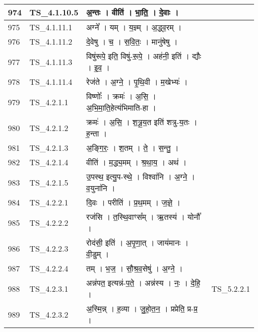 \documentclass[17pt]{extarticle}
\begin{document}
\begin{longtable}{||p{0.4in}||p{0.9in}||p{4.0in}||p{0.9in}||}
        \hline
            974 & TS\_4.1.10.5 & अ॒न्तः   ।   वीति॑   ।   भा॒ति॒   ।   दे॒वाः   ।    &      \\
        \hline
            975 & TS\_4.1.11.1 & अग्ने᳚   ।   यम्   ।   य॒ज्ञ्म्   ।   अ॒द्ध्व॒रम्   ।    &      \\
        \hline
            976 & TS\_4.1.11.2 & दे॒वेषु   ।   च॒   ।   स॒वि॒तः॒   ।   मानु॑षेषु   ।    &      \\
        \hline
            977 & TS\_4.1.11.3 & विषु॑रूपे॒ इति॒ विषु॑{-}रू॒पे॒   ।   अह॑नी॒ इति॑   ।   द्यौः   ।   इ॒व॒   ।    &      \\
        \hline
            978 & TS\_4.1.11.4 & रेज॑ते   ।   अ॒ग्ने॒   ।   पृ॒थि॒वी   ।   म॒खेभ्यः॑   ।    &      \\
        \hline
            979 & TS\_4.2.1.1 & विष्णोः᳚   ।   क्रमः॑   ।   अ॒सि॒   ।   अ॒भि॒मा॒ति॒हेत्य॑भिमाति{-}हा   ।    &      \\
        \hline
            980 & TS\_4.2.1.2 & क्रमः॑   ।   अ॒सि॒   ।   श॒त्रू॒य॒त इति॑ शत्रु{-}य॒तः   ।   ह॒न्ता   ।    &      \\
        \hline
            981 & TS\_4.2.1.3 & अ॒ङ्गि॒रः॒   ।   श॒तम्   ।   ते॒   ।   स॒न्तु॒   ।    &      \\
        \hline
            982 & TS\_4.2.1.4 & वीति॑   ।   म॒द्ध्य॒मम्   ।   श्र॒था॒य॒   ।   अथ॑   ।    &      \\
        \hline
            983 & TS\_4.2.1.5 & उ॒पस्थ॒ इत्यु॒प{-}स्थे॒   ।   विश्वा॑नि   ।   अ॒ग्ने॒   ।   व॒युना॑नि   ।    &      \\
        \hline
            984 & TS\_4.2.2.1 & दि॒वः   ।   परीति॑   ।   प्र॒थ॒मम्   ।   ज॒ज्ञे॒   ।    &      \\
        \hline
            985 & TS\_4.2.2.2 & रज॑सि   ।   त॒स्थि॒वाꣳस᳚म्   ।   ऋ॒तस्य॑   ।   योनौ᳚   ।    &      \\
        \hline
            986 & TS\_4.2.2.3 & रोद॑सी॒ इति॑   ।   अ॒पृ॒णा॒त्   ।   जाय॑मानः   ।   वी॒डुम्   ।    &      \\
        \hline
            987 & TS\_4.2.2.4 & तम्   ।   भ॒ज॒   ।   सौ॒श्र॒व॒सेषु॑   ।   अ॒ग्ने॒   ।    &      \\
        \hline
            988 & TS\_4.2.3.1 & अन्न॑पत॒ इत्यन्न॑{-}प॒ते॒   ।   अन्न॑स्य   ।   नः॒   ।   दे॒हि॒   ।    &  TS\_5.2.2.1       \\
        \hline
            989 & TS\_4.2.3.2 & अ॒स्मि॒न्न्   ।   ह॒व्या   ।   जु॒हो॒त॒न॒   ।   प्रप्रेति॒ प्र{-}प्र॒   ।    &      \\
        \hline

\end{longtable}
\end{document}
